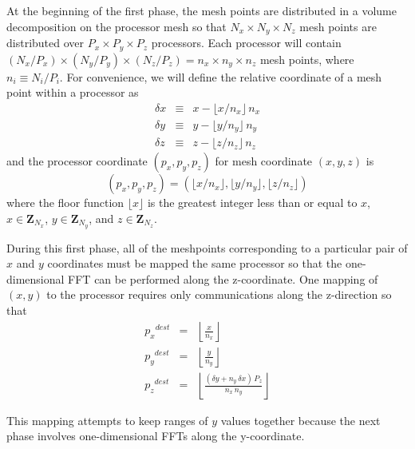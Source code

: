 \documentclass[pdftex,finalversion,simpleeqnnos,titlepage,12pt]{article}
\newcommand{\Z}{\ensuremath{\mathbf{Z}}}
\newcommand{\nodecount}{\ensuremath{P}}
\newcommand{\meshsize}[1]{\ensuremath{N_{#1}}}
\newcommand{\nodemeshsize}[1]{\ensuremath{\nodecount_{#1}}}
\newcommand{\nodecoord}[1]{\ensuremath{p_{#1}}}
\newcommand{\meshpernode}[1]{\ensuremath{n_{#1}}}
\begin{document}
At the beginning of the first phase, the mesh points are distributed
in a volume decomposition on the processor mesh so that
$\meshsize{x}\times\meshsize{y}\times\meshsize{z}$ mesh points are
distributed over $\nodemeshsize{x}\times\nodemeshsize{y}\times\nodemeshsize{z}$
processors. Each processor will contain
$(\meshsize{x}/\nodemeshsize{x})\times
(\meshsize{y}/\nodemeshsize{y})\times (\meshsize{z}/\nodemeshsize{z})
= \meshpernode{x}\times\meshpernode{y}\times\meshpernode{z}$
mesh points, where $\meshpernode{i} \equiv
\meshsize{i}/\nodemeshsize{i}$.  For convenience, we will define the
relative coordinate
of a mesh point within a processor as
\begin{eqnarray}
\delta x & \equiv & x - \lfloor x/\meshpernode{x}
\rfloor\,\meshpernode{x} \\
\delta y & \equiv & y - \lfloor y/\meshpernode{y}
\rfloor\,\meshpernode{y} \\
\delta z & \equiv & z - \lfloor z/\meshpernode{z}
\rfloor\,\meshpernode{z}
\end{eqnarray}
and the processor coordinate $(\nodecoord{x}, \nodecoord{y},
\nodecoord{z})$ for mesh coordinate $(x, y, z)$ is
\begin{equation}
(\nodecoord{x}, \nodecoord{y}, \nodecoord{z}) = (\lfloor
  x/\meshpernode{x} \rfloor, \lfloor y/\meshpernode{y} \rfloor, \lfloor
  z/\meshpernode{z} \rfloor)
\end{equation}
where the floor function $\lfloor x \rfloor$ is the greatest integer
less than or equal to $x$, $x \in \Z_{\meshsize{x}}$, $y \in
\Z_{\meshsize{y}}$, and $z \in \Z_{\meshsize{z}}$.

During this first phase, all of the meshpoints corresponding to a
particular pair of $x$ and $y$ coordinates must be mapped the same
processor so that the one-dimensional FFT can be performed along the
z-coordinate.  One mapping of $(x, y)$ to the processor requires only
communications along the z-direction so that
\begin{eqnarray}
\nodecoord{x}^{dest} & = & \left\lfloor \frac{x}{\meshpernode{x}} \right\rfloor \\
\nodecoord{y}^{dest} & = & \left\lfloor \frac{y}{\meshpernode{y}} \right\rfloor \\
\nodecoord{z}^{dest} & = & \left\lfloor \frac{ ( \delta y +
  \meshpernode{y}\,\delta x  ) \,\nodemeshsize{z} }{\meshpernode{x}\,\meshpernode{y}}\right\rfloor
\end{eqnarray}

This mapping attempts to keep ranges of $y$ values together because
the next phase involves one-dimensional FFTs along the y-coordinate.
\end{document}
